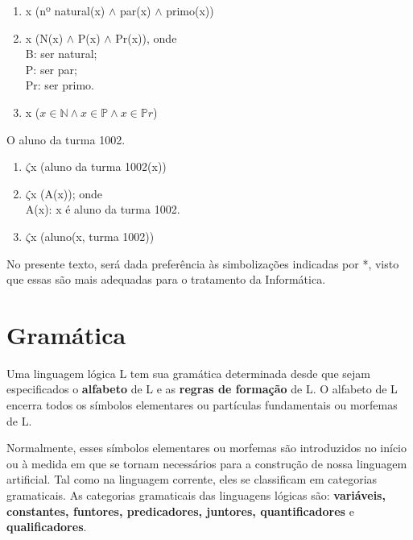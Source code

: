\begin{enumerate}[label=(\roman*)]
    \item x (nº natural(x) $\land$ par(x) $\land$ primo(x))
    \item x (N(x) $\land$ P(x) $\land$ Pr(x)), onde\\
    B: ser natural;\\
    P: ser par;\\
    Pr: ser primo.
    \item x ($x \in \mathbb{N} \land x \in \mathbb{P} \land x \in \mathbb{P} r$)
\end{enumerate}

\bigskip

\begin{exemplo} O aluno da turma 1002.
\end{exemplo}

\begin{enumerate}[label=(\roman*)]
    \item $\zeta$x (aluno da turma 1002(x))
    \item $\zeta$x (A(x)); onde\\
    A(x): x é aluno da turma 1002.
    \item $\zeta$x (aluno(x, turma 1002))
\end{enumerate}

No presente texto, será dada preferência às simbolizações indicadas por *, visto que essas são mais adequadas para o tratamento da Informática.

\newpage

\section{Gramática}
\setcounter{exemplo}{0}

Uma linguagem lógica L tem sua gramática determinada desde que sejam especificados o \textbf{alfabeto} de L e as \textbf{regras de formação} de L.
O alfabeto de L encerra todos os símbolos elementares ou partículas fundamentais ou morfemas de L.

Normalmente, esses símbolos elementares ou morfemas são introduzidos no início ou à medida em que se tornam necessários para a construção de nossa linguagem artificial.
Tal como na linguagem corrente, eles se classificam em categorias gramaticais.
As categorias gramaticais das linguagens lógicas são: \textbf{variáveis, constantes, funtores, predicadores, juntores, quantificadores} e \textbf{qualificadores}.

